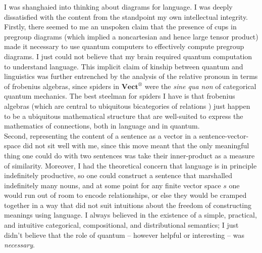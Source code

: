 I was shanghaied into thinking about diagrams for language. I was deeply dissatisfied with the content from the standpoint my own intellectual integrity. Firstly, there seemed to me an unspoken claim that the presence of cups in pregroup diagrams (which implied a noncartesian and hence large tensor product) made it necessary to use quantum computers to effectively compute pregroup diagrams. I just could not believe that my brain required quantum computation to understand language. This implicit claim of kinship between quantum and linguistics was further entrenched by the analysis of the relative pronoun in terms of frobenius algebras, since spiders in $\mathbf{Vect}^\otimes$ were the \emph{sine qua non} of categorical quantum mechanics. The best steelman for spiders I have is that frobenius algebras (which are central to ubiquitous bicategories of relations \citep{carboni_cartesian_1987,carboni_cartesian_2007}) just happen to be a ubiquitous mathematical structure that are well-suited to express the mathematics of connections, both in language and in quantum.\\

Second, representing the content of a sentence as a vector in a sentence-vector-space did not sit well with me, since this move meant that the only meaningful thing one could do with two sentences was take their inner-product as a measure of similarity. Moreover, I had the theoretical concern that language is in principle indefinitely productive, so one could construct a sentence that marshalled indefinitely many nouns, and at some point for any finite vector space $s$ one would run out of room to encode relationships, or else they would be cramped together in a way that did not suit intuitions about the freedom of constructing meanings using language. I always believed in the existence of a simple, practical, and intuitive categorical, compositional, and distributional semantics; I just didn't believe that the role of quantum -- however helpful or interesting -- was \emph{necessary}.

